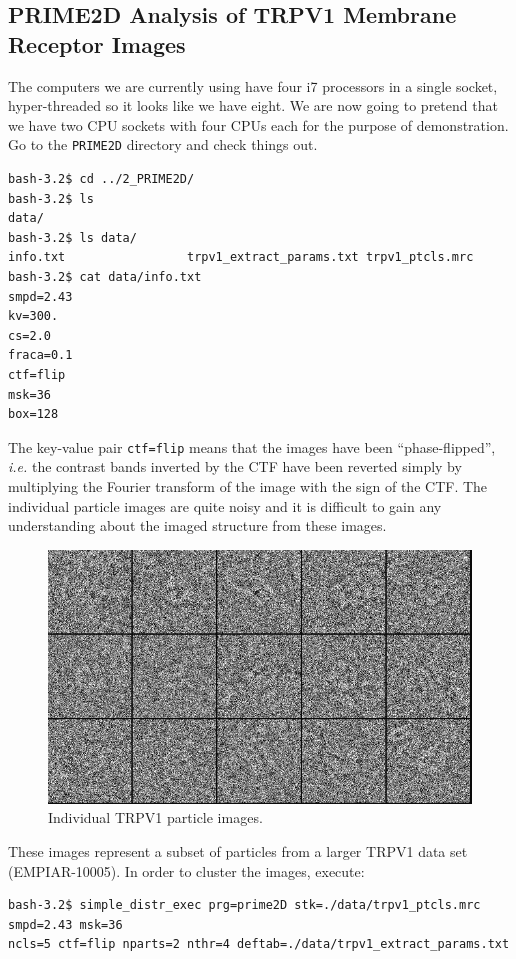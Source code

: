 \documentclass[a4paper,11pt]{article}
\begin{document}
\subsection{PRIME2D Analysis of TRPV1 Membrane Receptor Images}
The computers we are currently using have four i7 processors in a single socket, hyper-threaded so it looks like we have eight. We are now going to pretend that we have two CPU sockets with four CPUs each for the purpose of demonstration. Go to the \texttt{PRIME2D} directory and check things out.
\begin{verbatim}
bash-3.2$ cd ../2_PRIME2D/
bash-3.2$ ls
data/
bash-3.2$ ls data/
info.txt                 trpv1_extract_params.txt trpv1_ptcls.mrc
bash-3.2$ cat data/info.txt 
smpd=2.43
kv=300.
cs=2.0
fraca=0.1
ctf=flip
msk=36
box=128
\end{verbatim}
The key-value pair \texttt{ctf=flip} means that the images have been ``phase-flipped'', \textit{i.e.} the contrast bands inverted by the CTF have been reverted simply by multiplying the Fourier transform of the image with the sign of the CTF. The individual particle images are quite noisy and it is difficult to gain any understanding about the imaged structure from these images.
\begin{figure}
\includegraphics[keepaspectratio=true,scale=0.3]{./trpv1ptcls}
\caption{Individual TRPV1 particle images.}
\end{figure}
These images represent a subset of particles from a larger TRPV1 data set (EMPIAR-10005). In order to cluster the images, execute:
\begin{verbatim}
bash-3.2$ simple_distr_exec prg=prime2D stk=./data/trpv1_ptcls.mrc smpd=2.43 msk=36 
ncls=5 ctf=flip nparts=2 nthr=4 deftab=./data/trpv1_extract_params.txt
\end{verbatim}
\end{document}
